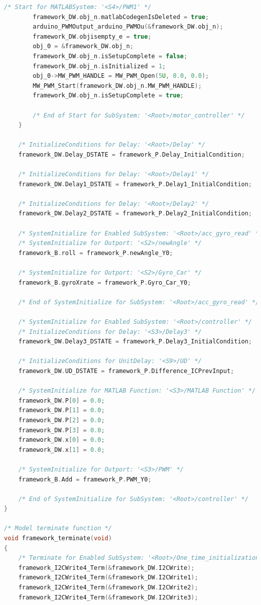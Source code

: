 \begin{lstlisting}[caption={Automatically generated C code}, language=c,firstnumber=698,label={lst:acg3}]
		/* Start for MATLABSystem: '<S4>/PWM1' */
		framework_DW.obj_n.matlabCodegenIsDeleted = true;
		arduino_PWMOutput_arduino_PWMOu(&framework_DW.obj_n);
		framework_DW.objisempty_e = true;
		obj_0 = &framework_DW.obj_n;
		framework_DW.obj_n.isSetupComplete = false;
		framework_DW.obj_n.isInitialized = 1;
		obj_0->MW_PWM_HANDLE = MW_PWM_Open(5U, 0.0, 0.0);
		MW_PWM_Start(framework_DW.obj_n.MW_PWM_HANDLE);
		framework_DW.obj_n.isSetupComplete = true;
		
		/* End of Start for SubSystem: '<Root>/motor_controller' */
	}
	
	/* InitializeConditions for Delay: '<Root>/Delay' */
	framework_DW.Delay_DSTATE = framework_P.Delay_InitialCondition;
	
	/* InitializeConditions for Delay: '<Root>/Delay1' */
	framework_DW.Delay1_DSTATE = framework_P.Delay1_InitialCondition;
	
	/* InitializeConditions for Delay: '<Root>/Delay2' */
	framework_DW.Delay2_DSTATE = framework_P.Delay2_InitialCondition;
	
	/* SystemInitialize for Enabled SubSystem: '<Root>/acc_gyro_read' */
	/* SystemInitialize for Outport: '<S2>/newAngle' */
	framework_B.roll = framework_P.newAngle_Y0;
	
	/* SystemInitialize for Outport: '<S2>/Gyro_Car' */
	framework_B.gyroXrate = framework_P.Gyro_Car_Y0;
	
	/* End of SystemInitialize for SubSystem: '<Root>/acc_gyro_read' */
	
	/* SystemInitialize for Enabled SubSystem: '<Root>/controller' */
	/* InitializeConditions for Delay: '<S3>/Delay3' */
	framework_DW.Delay3_DSTATE = framework_P.Delay3_InitialCondition;
	
	/* InitializeConditions for UnitDelay: '<S9>/UD' */
	framework_DW.UD_DSTATE = framework_P.Difference_ICPrevInput;
	
	/* SystemInitialize for MATLAB Function: '<S3>/MATLAB Function' */
	framework_DW.P[0] = 0.0;
	framework_DW.P[1] = 0.0;
	framework_DW.P[2] = 0.0;
	framework_DW.P[3] = 0.0;
	framework_DW.x[0] = 0.0;
	framework_DW.x[1] = 0.0;
	
	/* SystemInitialize for Outport: '<S3>/PWM' */
	framework_B.Add = framework_P.PWM_Y0;
	
	/* End of SystemInitialize for SubSystem: '<Root>/controller' */
}

/* Model terminate function */
void framework_terminate(void)
{
	/* Terminate for Enabled SubSystem: '<Root>/One_time_initialization' */
	framework_I2CWrite4_Term(&framework_DW.I2CWrite);
	framework_I2CWrite4_Term(&framework_DW.I2CWrite1);
	framework_I2CWrite4_Term(&framework_DW.I2CWrite2);
	framework_I2CWrite4_Term(&framework_DW.I2CWrite3);
	

\end{lstlisting}
